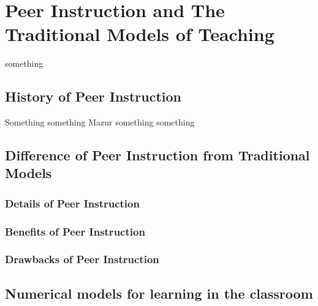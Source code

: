 \chapter{Peer Instruction and The Traditional Models of Teaching}

\hspace{\parindent} something
\section{History of Peer Instruction}
\hspace{\parindent} Something something Mazur something something
\newpage
\section{Difference of Peer Instruction from Traditional Models}
\subsection{Details of Peer Instruction}
\subsection{Benefits of Peer Instruction}
\subsection{Drawbacks of Peer Instruction}
\section{Numerical models for learning in the classroom}
